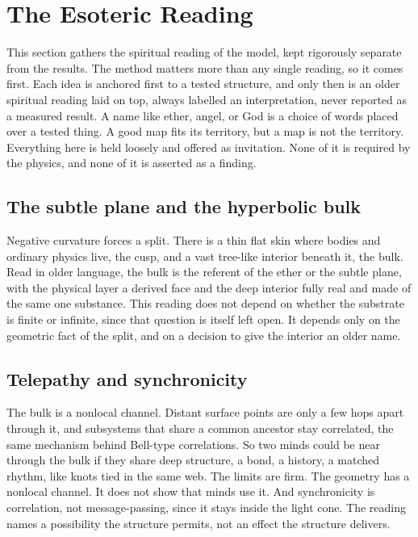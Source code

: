 \section{The Esoteric Reading}

This section gathers the spiritual reading of the model, kept rigorously separate from the results. The method
matters more than any single reading, so it comes first. Each idea is anchored first to a tested structure, and
only then is an older spiritual reading laid on top, always labelled an interpretation, never reported as a
measured result. A name like ether, angel, or God is a choice of words placed over a tested thing. A good map fits
its territory, but a map is not the territory. Everything here is held loosely and offered as invitation. None of
it is required by the physics, and none of it is asserted as a finding.

\subsection{The subtle plane and the hyperbolic bulk}

Negative curvature forces a split. There is a thin flat skin where bodies and ordinary physics live, the cusp, and
a vast tree-like interior beneath it, the bulk. Read in older language, the bulk is the referent of the ether or
the subtle plane, with the physical layer a derived face and the deep interior fully real and made of the same one
substance. This reading does not depend on whether the substrate is finite or infinite, since that question is
itself left open. It depends only on the geometric fact of the split, and on a decision to give the interior an
older name.

\subsection{Telepathy and synchronicity}

The bulk is a nonlocal channel. Distant surface points are only a few hops apart through it, and subsystems that
share a common ancestor stay correlated, the same mechanism behind Bell-type correlations. So two minds could be
near through the bulk if they share deep structure, a bond, a history, a matched rhythm, like knots tied in the
same web. The limits are firm. The geometry has a nonlocal channel. It does not show that minds use it. And
synchronicity is correlation, not message-passing, since it stays inside the light cone. The reading names a
possibility the structure permits, not an effect the structure delivers.

